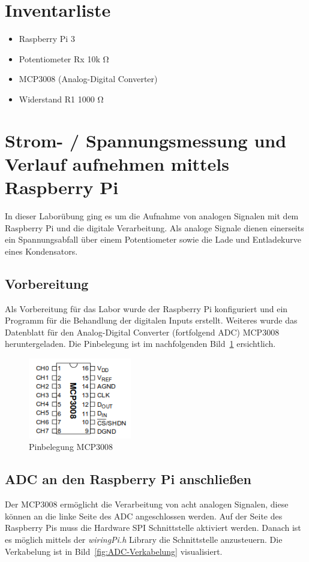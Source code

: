 \documentclass{article}
\begin{document}
\tableofcontents

\section{Inventarliste}
  \begin{itemize}
    \item Raspberry Pi 3
    \item Potentiometer Rx 10k \si{\ohm}
    \item MCP3008 (Analog-Digital Converter)
    \item Widerstand R1 1000 \si{\ohm}
  \end{itemize}

\newpage
\section{Strom- / Spannungsmessung und Verlauf aufnehmen mittels Raspberry Pi}
In dieser Laborübung ging es um die Aufnahme von analogen Signalen mit dem Raspberry Pi und die digitale Verarbeitung. 
Als analoge Signale dienen einerseits ein Spannungsabfall über einem Potentiometer sowie die Lade\- und Entladekurve eines Kondensators.

\subsection{Vorbereitung}
Als Vorbereitung für das Labor wurde der Raspberry Pi konfiguriert und ein Programm für die Behandlung der digitalen Inputs erstellt.
Weiteres wurde das Datenblatt für den Analog-Digital Converter (fortfolgend ADC) MCP3008 heruntergeladen. Die Pinbelegung ist im nachfolgenden Bild~\ref{fig:ADCPinbelegung} ersichtlich.

\begin{figure}[h!]
    \centering
    \includegraphics[width=0.4\textwidth]{MCP3008-Pinbelegung.png}
    \caption{Pinbelegung MCP3008}
    \label{fig:ADCPinbelegung}
\end{figure}

\newpage
\subsection{ADC an den Raspberry Pi anschließen}
Der MCP3008 ermöglicht die Verarbeitung von acht analogen Signalen, diese können an die linke Seite des ADC angeschlossen werden.
Auf der Seite des Raspberry Pis muss die Hardware SPI Schnittstelle aktiviert werden. Danach ist es möglich mittels der \textit{wiringPi.h} Library die Schnittstelle anzusteuern.
Die Verkabelung ist in Bild~\ref{fig:ADC-Verkabelung} visualisiert.
\end{document}
